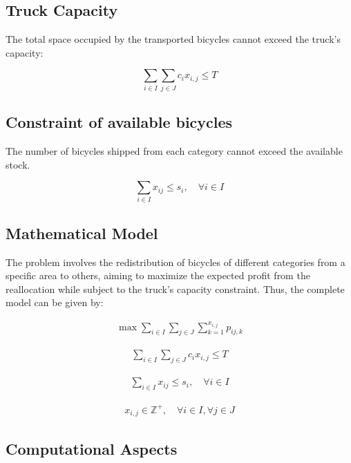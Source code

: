 \documentclass[]{article}
\begin{document}
\subsection{Truck Capacity}

The total space occupied by the transported bicycles cannot exceed the truck's capacity:

\begin{equation}
\sum_{i \in I} \sum_{j \in J} c_i x_{i,j} \leq T
\end{equation}

\subsection{Constraint of available bicycles}

The number of bicycles shipped from each category cannot exceed the available stock.

\begin{equation}
\sum_{i \in I} x_{ij} \leq s_i, \quad \forall i \in I
\end{equation}

\subsection{Mathematical Model}

The problem involves the redistribution of bicycles of different categories from a specific area to others, aiming to maximize the expected profit from the reallocation while subject to the truck's capacity constraint. Thus, the complete model can be given by:

	
\begin{align}
\max \sum_{i \in I} \sum_{j \in J} \sum_{k=1}^{x_{i,j}} p_{ij,k}
\end{align}

\begin{align}
\sum_{i \in I} \sum_{j \in J} c_i x_{i,j} \leq T
\end{align}

\begin{align}
\sum_{i \in I} x_{ij} \leq s_i, \quad \forall i \in I
\end{align}

\begin{align}
		x_{i,j} \in \mathbb{Z}^+,  \quad \forall i \in I, \forall j \in J
\end{align}
	


\subsection{Computational Aspects}
\end{document}
